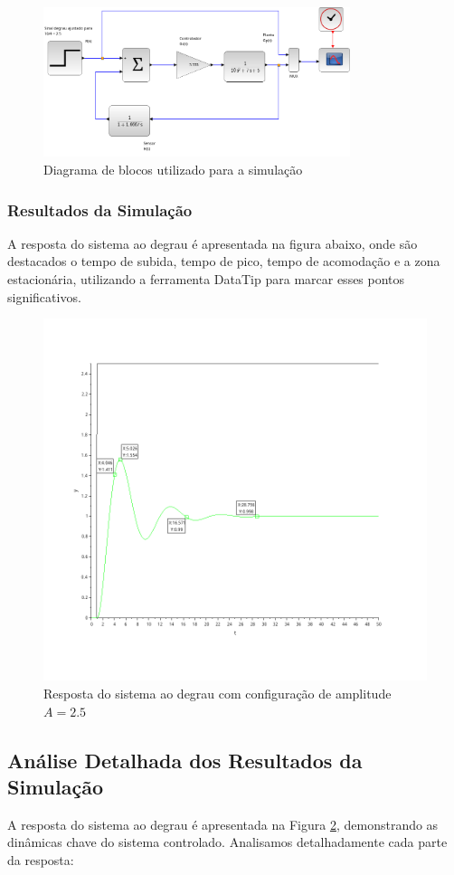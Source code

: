 \begin{figure}[H]
    \centering
    \includegraphics[width=0.8\textwidth]{5-atividade/assets/diagrama-b.png}
    \caption{Diagrama de blocos utilizado para a simulação}
    \label{fig:diagrama_blocos_b}
\end{figure}
\subsubsection{Resultados da Simulação}
A resposta do sistema ao degrau é apresentada na figura abaixo, onde são destacados o tempo de subida, tempo de pico, tempo de acomodação e a zona estacionária, utilizando a ferramenta DataTip para marcar esses pontos significativos.

\begin{figure}[H]
    \centering
    \includegraphics[height=0.7\textwidth]{5-atividade/assets/simulation-b.png}
    \caption{Resposta do sistema ao degrau com configuração de amplitude \( A = 2.5 \)}
    \label{fig:simulation_5b}
\end{figure}

\subsection{Análise Detalhada dos Resultados da Simulação}
A resposta do sistema ao degrau é apresentada na Figura \ref{fig:simulation_5b}, demonstrando as dinâmicas chave do sistema controlado. Analisamos detalhadamente cada parte da resposta:

